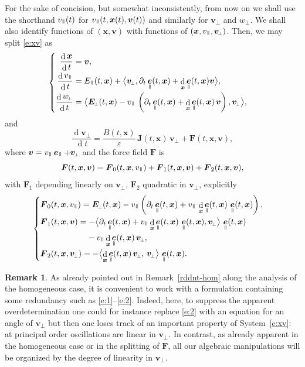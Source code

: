 \documentclass[JEP,XML,SOM,Unicode]{cedram}
\newenvironment{splitcases}
{\begin{cases}\begin{aligned}}
{\end{aligned}\end{cases}}
\newcommand{\sperp}{{\scriptscriptstyle\perp}}
\newcommand{\blangle}{\bigl\langle}
\newcommand{\brangle}{\bigr\rangle}
\let\eps\varepsilon
\let\d\partial
\DeclareMathOperator\dD{d}\let\dd\dD
\theoremstyle{plain}
\theoremstyle{definition}
\newtheorem{remark}[theorem]{Remark}
\newcommand\br{\begin{remark}}
\newcommand\er{\end{remark}}
\newcommand{\be}{\begin{equation}}
\newcommand{\ee}{\end{equation}}
\newcommand\bE{{\boldsymbol E}}
\newcommand\bF{{\boldsymbol F}}
\newcommand\bJ{{\boldsymbol J}}
\newcommand\bfv{{\boldsymbol v}}
\newcommand\bfx{{\boldsymbol x}}
\DeclareMathOperator{\beD}{\boldsymbol{e}}
\newcommand\eDpar{\beD_\mypar}
\newcommand\vpar{v_\mypar}
\newcommand\bvperp{\bfv_{\!\sperp}}
\newcommand\eperp{w_{\!\sperp}}
\newcommand\Epar{E_\mypar}
\newcommand\Eperp{\bE_{\!\sperp}}
\newcommand{\mypar}{{\mkern3mu\vphantom{\perp}\vrule depth 0pt\mkern2mu\vrule depth 0pt\mkern3mu}}
\begin{document}
For the sake of concision, but somewhat inconsistently, from now on we shall use the shorthand $\vpar(t)$ for $\vpar(t,\bfx(t),\bfv(t))$ and similarly for $\bvperp$ and $\eperp$. We shall also identify functions of $(\bfx,\bfv)$ with functions of $(\bfx,\vpar,\bvperp)$. Then, we may split \eqref{e:xv} as
\be
\label{e:1}
\begin{splitcases}
\frac{\dD\bfx}{\dD t} &=\bfv,
\\
\frac{\dD\vpar}{\dD t}&=\Epar(t,\bfx)+\blangle \bvperp ,
\d_t\eDpar(t,\bfx)+\dD_{\bfx}\eDpar(t,\bfx)\bfv \brangle,
\\
\frac{\dD\eperp}{\dD t}&= \blangle \Eperp(t,\bfx)-\vpar\,\left(\d_t\eDpar(t,\bfx)+\dD_{\bfx}\eDpar(t,\bfx)\,\bfv\right), \bvperp\brangle,
\end{splitcases}
\ee
and
\be
\label{e:2}
\frac{\dD\bvperp}{\dD t}=
\frac{B(t,\bfx)}{\eps}\, \bJ(t,\bfx)\,\bvperp
+ \bF(t,\bfx,\bfv),
\ee
where $\bfv=\vpar\eDpar+\bvperp$ and the force field $\bF$ is
\[
\bF(t,\bfx,\bfv)=\bF_0(t,\bfx,\vpar)+\bF_1(t,\bfx,\bfv)+\bF_2(t,\bfx,\bfv),
\]
with $\bF_1$ depending linearly on $\bvperp$, $\bF_2$ quadratic in $\bvperp$, explicitly
\be
\label{def:F}
\begin{splitcases}
&\bF_0(t,\bfx,\vpar) =  \Eperp(t,\bfx)-
\vpar\left(\d_t\eDpar(t,\bfx)+\vpar\,\dD_{\bfx}\eDpar(t,\bfx)\,\eDpar(t,\bfx)\right),
\\
&\bF_1(t,\bfx,\bfv) =  -
\blangle\d_t\eDpar(t,\bfx)+\vpar\dD_{\bfx}\eDpar(t,\bfx)\,\eDpar(t,\bfx),
\bvperp
\brangle\,\eDpar(t,\bfx)\\
&\hphantom{\bF_1(t,\bfx,\bfv)=}-\vpar\dD_{\bfx}\eDpar(t,\bfx)\,\bvperp,
\\
&\bF_2(t,\bfx,\bvperp) =  - \blangle
\dD_{\bfx}\eDpar(t,\bfx)\,\bvperp,\, \bvperp \brangle\,\eDpar(t,\bfx).
\end{splitcases}
\ee

\br
As already pointed out in Remark~\ref{rddnt-hom} along the analysis of the homogeneous case, it is convenient to work with a formulation containing some redundancy such as \eqref{e:1}--\eqref{e:2}. Indeed, here, to suppress the apparent overdetermination one could for instance replace \eqref{e:2} with an equation for an angle of $\bvperp$ but then one loses track of an important property of System~\eqref{e:xv}: at principal order oscillations are linear in $\bvperp$. In contrast, as already apparent in the homogeneous case or in the splitting of $\bF$, all our algebraic manipulations will be organized by the degree of linearity in $\bvperp$.
\er
\end{document}
